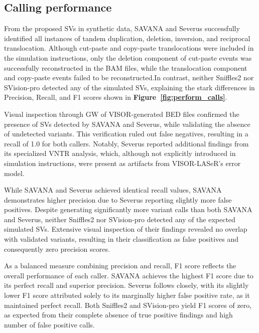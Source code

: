 \subsection{Calling performance}

From the proposed SVs in synthetic data, SAVANA and Severus successfully identified 
all instances of tandem duplication, deletion, inversion, and reciprocal 
translocation. Although cut-paste and copy-paste translocations were included in 
the simulation instructions, only the deletion component of cut-paste events was 
successfully reconstructed in the BAM files, while the translocation component and 
copy-paste events failed to be reconstructed.In contrast, neither Sniffles2 nor 
SVision-pro detected any of the simulated SVs, explaining the stark differences 
in Precision, Recall, and F1 scores shown in \textbf{Figure~\ref{fig:perform_calls}}. 


Visual inspection through GW of VISOR-generated BED files confirmed the presence 
of SVs detected by SAVANA and Severus, while validating the absence of 
undetected variants. This verification ruled out false negatives, resulting in a 
recall of 1.0 for both callers. Notably, Severus reported additional findings 
from its specialized VNTR analysis, which, although not explicitly introduced in 
simulation instructions, were present as artifacts from VISOR-LASeR's error 
model.

While SAVANA and Severus achieved identical recall values, SAVANA demonstrates 
higher precision due to Severus reporting slightly more false positives. Despite 
generating significantly more variant calls than both SAVANA and Severus, 
neither Sniffles2 nor SVision-pro detected any of the expected simulated SVs. 
Extensive visual inspection of their findings revealed no overlap with validated 
variants, resulting in their classification as false positives and consequently 
zero precision scores.

As a balanced measure combining precision and recall, F1 score reflects the 
overall performance of each caller. SAVANA achieves the highest F1 score due to 
its perfect recall and superior precision. Severus follows closely, with its 
slightly lower F1 score attributed solely to its marginally higher false 
positive rate, as it maintained perfect recall. Both Sniffles2 and SVision-pro 
yield F1 scores of zero, as expected from their complete absence of true 
positive findings and high number of false positive calls.


